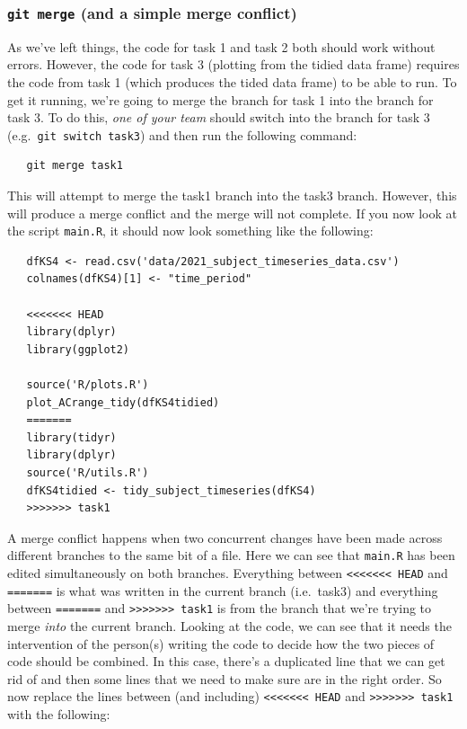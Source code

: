 \documentclass[
  12pt,
]{article}
\begin{document}
\hypertarget{git-merge-and-a-simple-merge-conflict}{%
\subsubsection{\texorpdfstring{\texttt{git\ merge} (and a simple merge
conflict)}{git merge (and a simple merge conflict)}}\label{git-merge-and-a-simple-merge-conflict}}

As we've left things, the code for task 1 and task 2 both should work
without errors. However, the code for task 3 (plotting from the tidied
data frame) requires the code from task 1 (which produces the tided data
frame) to be able to run. To get it running, we're going to merge the
branch for task 1 into the branch for task 3. To do this, \emph{one of
your team} should switch into the branch for task 3
(e.g.~\texttt{git\ switch\ task3}) and then run the following command:

\begin{verbatim}
   git merge task1
\end{verbatim}

This will attempt to merge the task1 branch into the task3 branch.
However, this will produce a merge conflict and the merge will not
complete. If you now look at the script \texttt{main.R}, it should now
look something like the following:

\begin{verbatim}
   dfKS4 <- read.csv('data/2021_subject_timeseries_data.csv')
   colnames(dfKS4)[1] <- "time_period"

   <<<<<<< HEAD
   library(dplyr)
   library(ggplot2)

   source('R/plots.R')
   plot_ACrange_tidy(dfKS4tidied)
   =======
   library(tidyr)
   library(dplyr)
   source('R/utils.R')
   dfKS4tidied <- tidy_subject_timeseries(dfKS4)
   >>>>>>> task1
\end{verbatim}

A merge conflict happens when two concurrent changes have been made
across different branches to the same bit of a file. Here we can see
that \texttt{main.R} has been edited simultaneously on both branches.
Everything between
\texttt{\textless{}\textless{}\textless{}\textless{}\textless{}\textless{}\textless{}\ HEAD}
and \texttt{=======} is what was written in the current branch
(i.e.~task3) and everything between \texttt{=======} and
\texttt{\textgreater{}\textgreater{}\textgreater{}\textgreater{}\textgreater{}\textgreater{}\textgreater{}\ task1}
is from the branch that we're trying to merge \emph{into} the current
branch. Looking at the code, we can see that it needs the intervention
of the person(s) writing the code to decide how the two pieces of code
should be combined. In this case, there's a duplicated line that we can
get rid of and then some lines that we need to make sure are in the
right order. So now replace the lines between (and including)
\texttt{\textless{}\textless{}\textless{}\textless{}\textless{}\textless{}\textless{}\ HEAD}
and
\texttt{\textgreater{}\textgreater{}\textgreater{}\textgreater{}\textgreater{}\textgreater{}\textgreater{}\ task1}
with the following:
\end{document}
